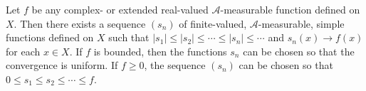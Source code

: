 Let $f$ be any complex- or extended real-valued $\mathcal{A}$-measurable function defined on $X$. Then there exists a sequence $(s_n)$ of finite-valued, $\mathcal{A}$-measurable, simple functions defined on $X$ such that $|s_1| \leq |s_2| \leq \cdots \leq |s_n| \leq \cdots$ and $s_n(x) \rightarrow f(x)$ for each $x \in X$. If $f$ is bounded, then the functions $s_n$ can be chosen so that the convergence is uniform. If $f \geq 0$, the sequence $(s_n)$ can be chosen so that $0 \leq s_1 \leq s_2 \leq \cdots \leq f$.